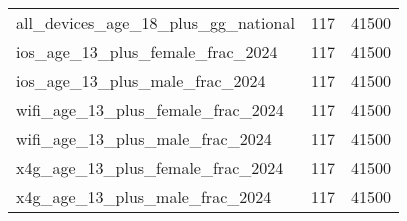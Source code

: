 \begin{table}[ht]
\begin{tabular}{lrr}
  all\_devices\_age\_18\_plus\_gg\_national & 117 & 41500 \\ 
  ios\_age\_13\_plus\_female\_frac\_2024 & 117 & 41500 \\ 
  ios\_age\_13\_plus\_male\_frac\_2024 & 117 & 41500 \\ 
  wifi\_age\_13\_plus\_female\_frac\_2024 & 117 & 41500 \\ 
  wifi\_age\_13\_plus\_male\_frac\_2024 & 117 & 41500 \\ 
  x4g\_age\_13\_plus\_female\_frac\_2024 & 117 & 41500 \\ 
  x4g\_age\_13\_plus\_male\_frac\_2024 & 117 & 41500 \\ 
   \hline
\end{tabular}
\end{table}
